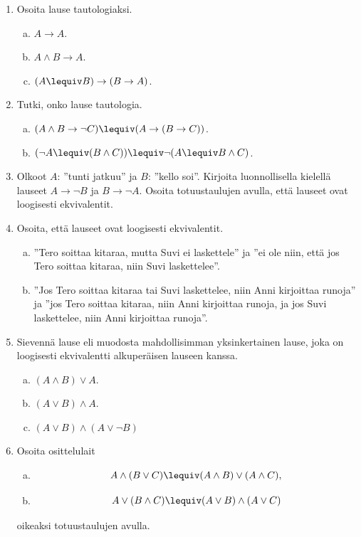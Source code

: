 \begin{enumerate}

\item Osoita lause tautologiaksi.
\begin{enumerate}[a)]
\item $A\to A$.
\item $A\land B \to A$.
\item $(A\lequiv B) \to (B\to A)$.

\end{enumerate}

\item Tutki, onko lause tautologia.
\begin{enumerate}[a)]
\item $(A\land B \to \lnot C)\lequiv (A\to(B\to C))$.
\item $(\lnot A \lequiv (B \land C)) \lequiv \lnot (A
\lequiv B \land C)$.
\end{enumerate}

\item Olkoot $A$: ''tunti jatkuu'' ja $B$: ''kello soi''.
Kirjoita luonnollisella kielellä lauseet $A\to \lnot B$
ja $B\to \lnot A$. Osoita totuustaulujen avulla, että
lauseet ovat loogisesti ekvivalentit.

\item Osoita, että lauseet ovat loogisesti ekvivalentit.
\begin{enumerate}[a)]
\item ''Tero soittaa kitaraa, mutta Suvi ei
laskettele'' ja ''ei ole niin, että jos Tero soittaa
kitaraa, niin Suvi laskettelee''.
\item ''Jos Tero soittaa kitaraa tai Suvi laskettelee,
niin Anni kirjoittaa runoja'' ja ''jos Tero soittaa
kitaraa, niin Anni kirjoittaa runoja, ja jos Suvi
laskettelee, niin Anni kirjoittaa runoja''.
\end{enumerate}

\item Sievennä lause eli muodosta mahdollisimman
yksinkertainen lause, joka on loogisesti ekvivalentti
alkuperäisen lauseen kanssa.
\begin{enumerate}[a)]
\item $(A\land B) \lor A$.
\item $(A\lor B) \land A$.
\item $(A\lor B) \land (A\lor \lnot B)$
\end{enumerate}

\item Osoita osittelulait
\begin{enumerate}[a)]
\item
\[
A \land (B \lor C) \lequiv (A \land B) \lor (A\land C),
\]
\item
\[
A \lor (B \land C) \lequiv (A \lor B) \land (A\lor C)
\]
\end{enumerate}
oikeaksi totuustaulujen avulla.


\end{enumerate}
